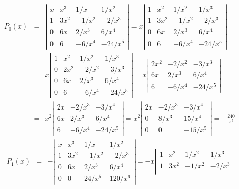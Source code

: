 \documentclass{ximera}
\begin{document}
\begin{problem}
\begin{enumerate}
\begin{solution}
\begin{eqnarray*}
P_0(x)&=&
\left|\begin{array}{ccrc}
x&x^3&1/x&1/x^2\\
1&3x^2&-1/x^2&-2/x^3\\
0&6x&2/x^3&6/x^4\\
0&6&-6/x^4&-24/x^5
\end{array}\right|=
x\left|\begin{array}{ccrc}
1&x^2&1/x^2&1/x^3\\
1&3x^2&-1/x^2&-2/x^3\\
0&6x&2/x^3&6/x^4\\
0&6&-6/x^4&-24/x^5
\end{array}\right|\\
&=&x\left|\begin{array}{ccrc}
1&x^2&1/x^2&1/x^3\\
0&2x^2&-2/x^2&-3/x^3\\
0&6x&2/x^3&6/x^4\\
0&6&-6/x^4&-24/x^5
\end{array}\right|=
x\left|\begin{array}{crc}
2x^2&-2/x^2&-3/x^3\\
6x&2/x^3&6/x^4\\
6&-6/x^4&-24/x^5
\end{array}\right|\\
&=&x^2\left|\begin{array}{crc}
2x&-2/x^3&-3/x^4\\
6x&2/x^3&6/x^4\\
6&-6/x^4&-24/x^5
\end{array}\right|
=x^2\left|\begin{array}{crc}
2x&-2/x^3&-3/x^4\\
0&8/x^3&15/x^4\\
0&0&-15/x^5
\end{array}\right|=-\frac{240}{x^5}
\end{eqnarray*}
\begin{eqnarray*}
P_1(x)&=&
-\left|\begin{array}{cccc}
x&x^3&1/x&1/x^2\\
1&3x^2&-1/x^2&-2/x^3\\
0&6x&2/x^3&6/x^4\\0&0&24/x^5&120/x^6
\end{array}\right|=
-x\left|\begin{array}{cccc}
1&x^2&1/x^2&1/x^3\\
1&3x^2&-1/x^2&-2/x^3\\

\end{array}
\end{eqnarray*}
\end{solution}
\end{enumerate}
\end{problem}
\end{document}
